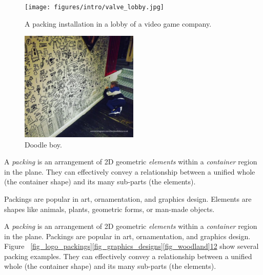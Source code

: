 \begin{figure}
\centering
\texttt{[image: figures/intro/valve\_lobby.jpg]} 
\caption{\label{fig_valve_lobby} 
A packing installation in a lobby of a video game company. }
\end{figure}

\begin{figure}
\centering
\includegraphics[width=0.5\textwidth]{figures/intro/doodle_boy.pdf} 
\caption{\label{fig_doodle_boy} 
Doodle boy. }
\end{figure}


A \textit{packing} is an arrangement of 2D geometric
\textit{elements} within a \textit{container} region in the plane.
They can effectively convey a relationship between a unified whole (the
container shape) and its many sub-parts (the elements).

Packings are popular in art, ornamentation, and graphics
design.
Elements are shapes like animals,
plants, geometric forms, or man-made objects.




A \textit{packing} is an arrangement of 2D geometric
\textit{elements} within a \textit{container} region in the plane.
Packings are popular in art, ornamentation, and graphics design.
Figure ~\ref{fig_logo_packings}\ref{fig_graphics_designs}\ref{fig_woodland}\ref{fig_valve_lobby}\ref{fig_doodle_boy} show several packing examples.
They can effectively convey a relationship between a unified whole (the
container shape) and its many sub-parts (the elements).

